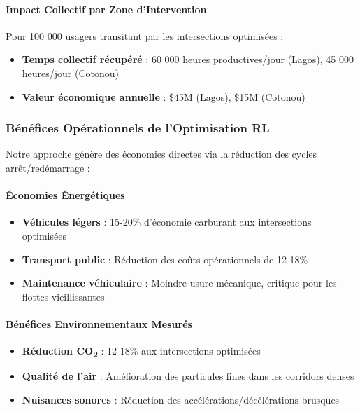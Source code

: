 \paragraph{Impact Collectif par Zone d'Intervention}
Pour 100 000 usagers transitant par les intersections optimisées :
\begin{itemize}
    \item \textbf{Temps collectif récupéré} : 60 000 heures productives/jour (Lagos), 45 000 heures/jour (Cotonou)
    \item \textbf{Valeur économique annuelle} : \$45M (Lagos), \$15M (Cotonou)
\end{itemize}

\subsubsection{Bénéfices Opérationnels de l'Optimisation RL}

Notre approche génère des économies directes via la réduction des cycles arrêt/redémarrage :

\paragraph{Économies Énergétiques}
\begin{itemize}
    \item \textbf{Véhicules légers} : 15-20\% d'économie carburant aux intersections optimisées
    \item \textbf{Transport public} : Réduction des coûts opérationnels de 12-18\%
    \item \textbf{Maintenance véhiculaire} : Moindre usure mécanique, critique pour les flottes vieillissantes
\end{itemize}

\paragraph{Bénéfices Environnementaux Mesurés}
\begin{itemize}
    \item \textbf{Réduction CO\textsubscript{2}} : 12-18\% aux intersections optimisées
    \item \textbf{Qualité de l'air} : Amélioration des particules fines dans les corridors denses
    \item \textbf{Nuisances sonores} : Réduction des accélérations/décélérations brusques
\end{itemize}

